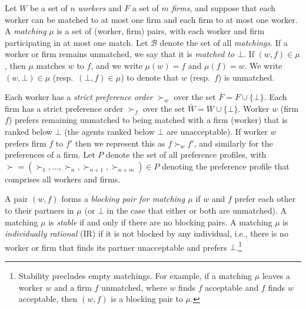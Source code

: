 \documentclass[11pt,letterpaper]{article}
\theoremstyle{definition}
\newtheorem{remark}[theorem]{Remark}
\begin{document}

Let $W$ be a set of $n$ {\em workers} and $F$ a set of $m$ {\em firms}, and
suppose that each worker can be matched to at most one firm and each
firm to at most one worker.  A {\em matching} $\mu$ is a set of
(worker, firm) pairs, with each worker and firm participating in at
most one match. Let ${\mathcal B}$ denote the set of all
{\em matchings}. If a worker or firm remains unmatched, we say
that it is {\em matched to $\bot$}.
If $(w,f)\in \mu$, then $\mu$ matches $w$ to $f$, and
we write $\mu(w)=f$ and
$\mu(f)=w$. We write $(w,\bot)\in \mu$ (resp.~$(\bot,f)\in \mu$) to
denote that $w$ (resp.~$f$) is unmatched. 

Each worker has a {\em strict preference order} $\succ_w$ over the set
$\overline{F} = F\cup \{\bot\}$. Each firm has a strict preference order $\succ_f$
over the set $\overline{W} = W\cup \{\bot\}$.
%
Worker $w$ (firm $f$) prefers remaining
unmatched to being matched with a firm (worker) that is ranked below
$\bot$ (the agents ranked below $\bot$ are unacceptable).
If worker $w$ prefers firm $f$ to $f'$ then we represent this as
$f \succ_w f'$, and similarly for the preferences of a firm.  Let $P$ denote the set of all preference profiles,
with 
$\succ=(\succ_1,\ldots,\succ_n,\succ_{n+1},\succ_{n+m})\in P$  denoting the
preference  profile that comprises  all
workers and firms.

  A pair $(w,f)$ forms a {\em blocking pair for matching $\mu$} if $w$
  and $f$ prefer each other to their partners in $\mu$ (or $\bot$ in
  the case that either or both are unmatched).  A matching $\mu$ is {\em stable}
  if and only if there are no blocking pairs.
  A matching $\mu$ is {\em individually rational} (IR) if
  it is not blocked by any individual, i.e., there is no 
  worker or firm that finds its partner 
  unacceptable and prefers $\bot$.\footnote{Stability precludes empty matchings. For example, if  a matching
    $\mu$ leaves a worker $w$ and a firm $f$ unmatched, where $w$
    finds $f$ acceptable and $f$ finds $w$ acceptable, then $(w,f)$ is
    a blocking pair to $\mu$.}
%
    
\end{document}
